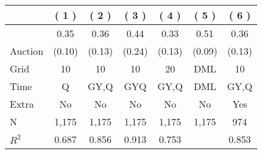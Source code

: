 
\begin{tabular}{lcccccc}
\toprule
 & ( 1 ) & ( 2 ) & ( 3 ) & ( 4 ) & ( 5 ) & ( 6 )\\
\midrule
 & 0.35 & 0.36 & 0.44 & 0.33 & 0.51 & 0.36\\

\multirow{-2}{*}{\raggedright\arraybackslash Auction} & (0.10) & (0.13) & (0.24) & (0.13) & (0.09) & (0.13)\\

\midrule
Grid & 10 & 10 & 10 & 20 & DML & 10\\

Time & Q & GY,Q & GYQ & GY,Q & DML & GY,Q\\

Extra & No & No & No & No & No & Yes\\

N & 1,175 & 1,175 & 1,175 & 1,175 & 1,175 & 974\\

$R^2$ & 0.687 & 0.856 & 0.913 & 0.753 &  & 0.853\\
\bottomrule
\end{tabular}
